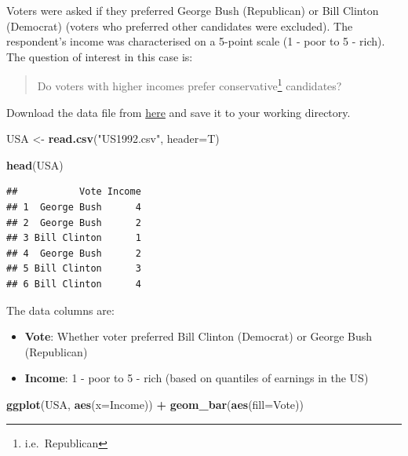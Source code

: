 \documentclass[]{book}
\newenvironment{Shaded}{\begin{snugshade}}{\end{snugshade}}
\newcommand{\KeywordTok}[1]{\textcolor[rgb]{0.13,0.29,0.53}{\textbf{#1}}}
\newcommand{\DataTypeTok}[1]{\textcolor[rgb]{0.13,0.29,0.53}{#1}}
\newcommand{\StringTok}[1]{\textcolor[rgb]{0.31,0.60,0.02}{#1}}
\newcommand{\OperatorTok}[1]{\textcolor[rgb]{0.81,0.36,0.00}{\textbf{#1}}}
\newcommand{\NormalTok}[1]{#1}
\providecommand{\tightlist}{%
  \setlength{\itemsep}{0pt}\setlength{\parskip}{0pt}}
\let\rmarkdownfootnote\footnote%
\def\footnote{\protect\rmarkdownfootnote}
\theoremstyle{definition}
\theoremstyle{definition}
\theoremstyle{definition}
\theoremstyle{remark}
\begin{document}
Voters were asked if they preferred George Bush (Republican) or Bill
Clinton (Democrat) (voters who preferred other candidates were
excluded). The respondent's income was characterised on a 5-point scale
(1 - poor to 5 - rich). The question of interest in this case is:

\begin{quote}
Do voters with higher incomes prefer conservative\footnote{i.e.~Republican}
candidates?
\end{quote}

Download the data file from
\href{https://exeter-data-analytics.github.io/StatModelling/_data/US1992.csv}{here}
and save it to your working directory.

\begin{Shaded}
\begin{Highlighting}[]
\NormalTok{USA <-}\StringTok{ }\KeywordTok{read.csv}\NormalTok{(}\StringTok{"US1992.csv"}\NormalTok{, }\DataTypeTok{header=}\NormalTok{T)}
\end{Highlighting}
\end{Shaded}

\begin{Shaded}
\begin{Highlighting}[]
\KeywordTok{head}\NormalTok{(USA)}
\end{Highlighting}
\end{Shaded}

\begin{verbatim}
##           Vote Income
## 1  George Bush      4
## 2  George Bush      2
## 3 Bill Clinton      1
## 4  George Bush      2
## 5 Bill Clinton      3
## 6 Bill Clinton      4
\end{verbatim}

The data columns are:

\begin{itemize}
\tightlist
\item
  \textbf{Vote}: Whether voter preferred Bill Clinton (Democrat) or
  George Bush (Republican)
\item
  \textbf{Income}: 1 - poor to 5 - rich (based on quantiles of earnings
  in the US)
\end{itemize}

\begin{Shaded}
\begin{Highlighting}[]
\KeywordTok{ggplot}\NormalTok{(USA, }\KeywordTok{aes}\NormalTok{(}\DataTypeTok{x=}\NormalTok{Income)) }\OperatorTok{+}\StringTok{ }\KeywordTok{geom_bar}\NormalTok{(}\KeywordTok{aes}\NormalTok{(}\DataTypeTok{fill=}\NormalTok{Vote))}
\end{Highlighting}
\end{Shaded}
\end{document}
